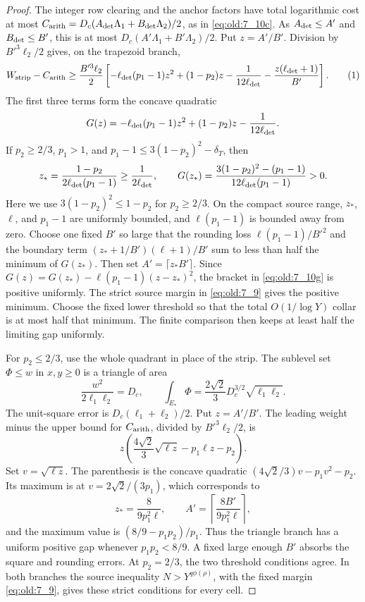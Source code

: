 \begin{proof}
The integer row clearing and the anchor factors have total logarithmic
cost at most
\(C_{\rm arith}=D_c(A_{\rm det}\Lambda_1+B_{\rm det}\Lambda_2)/2\), as in
\eqref{eq:old:7_10c}. As \(A_{\rm det}\le A'\) and \(B_{\rm det}\le B'\),
this is at most
\(D_c(A'\Lambda_1+B'\Lambda_2)/2\). Put \(z=A'/B'\). Division by
\(B'^3\ell_2/2\) gives, on the trapezoid branch,
\[
 W_{\rm strip}-C_{\rm arith}\ge\frac{B'^3\ell_2}{2}
 \left[-\ell_{\rm det}(p_1-1)z^2+(1-p_2)z-\frac1{12\ell_{\rm det}}
       -\frac{z(\ell_{\rm det}+1)}{B'}\right].          \AutoTag{eq:old:7_10g}
\]
The first three terms form the concave quadratic
\[
 G(z)=-\ell_{\rm det}(p_1-1)z^2+(1-p_2)z
       -\frac1{12\ell_{\rm det}}.
\]
If \(p_2\ge2/3\), \(p_1>1\), and
\(p_1-1\le3(1-p_2)^2-\delta_T\), then
\[
 z_* =\frac{1-p_2}{2\ell_{\rm det}(p_1-1)}
 \ge\frac1{2\ell_{\rm det}},\qquad
 G(z_*)=\frac{3(1-p_2)^2-(p_1-1)}
 {12\ell_{\rm det}(p_1-1)}>0.
\]
Here we use \(3(1-p_2)^2\le1-p_2\) for \(p_2\ge2/3\). On the compact
source range, \(z_*\), \(\ell\), and \(p_1-1\) are uniformly bounded,
and \(\ell(p_1-1)\) is bounded away from zero. Choose one fixed \(B'\)
so large that the rounding loss
\(\ell(p_1-1)/B'^2\) and the boundary term
\((z_*+1/B')(\ell+1)/B'\) sum to less than half the minimum of
\(G(z_*)\). Then set \(A'=\lceil z_*B'\rceil\). Since
\(G(z)=G(z_*)-\ell(p_1-1)(z-z_*)^2\), the bracket in \eqref{eq:old:7_10g} is
positive uniformly. The strict source margin in \eqref{eq:old:7_9} gives the
positive minimum. Choose the fixed lower threshold so that the total
\(O(1/\log Y)\) collar is at most half that minimum. The finite comparison
then keeps at least half the limiting gap uniformly.

For \(p_2\le2/3\), use the whole quadrant in place of the strip.
The sublevel set \(\Phi\le w\) in \(x,y\ge0\) is a triangle of area
\[
 \frac{w^2}{2\ell_1\ell_2}=D_c,\qquad
 \int_{E_*}\Phi=\frac{2\sqrt2}{3}D_c^{3/2}\sqrt{\ell_1\ell_2}.
\]
The unit-square error is \(D_c(\ell_1+\ell_2)/2\). Put \(z=A'/B'\). The
leading weight minus the upper bound for \(C_{\rm arith}\), divided by
\(B'^3\ell_2/2\), is
\[
 z\left(\frac{4\sqrt2}{3}\sqrt{\ell z}-p_1\ell z-p_2\right).
\]
Set \(v=\sqrt{\ell z}\). The parenthesis is the concave quadratic
\((4\sqrt2/3)v-p_1v^2-p_2\). Its maximum is at
\(v=2\sqrt2/(3p_1)\), which corresponds to
\[
 z_* =\frac{8}{9p_1^2\ell},\qquad
 A'=\left\lceil\frac{8B'}{9p_1^2\ell}\right\rceil,
\]
and the maximum value is
\((8/9-p_1p_2)/p_1\). Thus the triangle branch has a uniform positive
gap whenever \(p_1p_2<8/9\). A fixed large enough \(B'\) absorbs
the square and rounding errors. At \(p_2=2/3\), the two threshold
conditions agree. In both branches the source inequality
\(N>Y^{q\phi(\rho)}\), with the fixed margin \eqref{eq:old:7_9}, gives
these strict conditions for every cell.


\end{proof}
